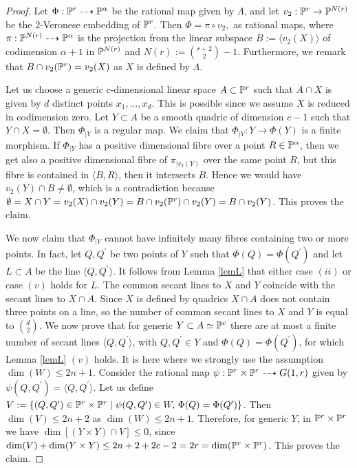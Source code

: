 \documentclass{amsart}
\theoremstyle{definition}
\begin{document}
\begin{proof}
Let $\Phi:\Bbb{P}^r\dashrightarrow\Bbb{P}^{\alpha}$ be the rational
map given by $\Lambda$, and let $v_{2}:\Bbb{P}^r\to\Bbb{P}^{N(r)}$
be the $2$-Veronese embedding of $\Bbb{P}^r$. Then $\Phi =\pi \circ
v_{2},$ as rational maps, where
$\pi:\Bbb{P}^{N(r)}\dashrightarrow\Bbb P^{\alpha}$ is the projection
from the linear subspace $B:=\langle v_2(X)\rangle $ of codimension
$\alpha+1$ in $\Bbb{P}^{N(r)}$ and $N(r):=\binom{r+2}{2}-1$.
Furthermore, we remark that $B\cap v_{2}(\Bbb{P}^{r})=v_{2}(X)$ as
$X$ is defined by $\Lambda$.

Let us choose a generic $c$-dimensional linear space $A\subset
\Bbb{P}^{r}$ such that $A\cap X$ is given by $d$ distinct points
$x_{1},\dots,x_{d}$. This is possible since we assume $X$ is reduced
in codimension zero. Let $Y\subset A$ be a smooth quadric of
dimension $c-1$ such that $Y\cap X=\emptyset$. Then $\Phi_{|Y}$ is a
regular map. We claim that $\Phi _{|Y}:Y\to\Phi(Y)$ is a finite
morphism. If $\Phi_{|Y}$ has a positive dimensional fibre over a
point $R\in \Bbb{P}^{\alpha }$, then we get also a positive
dimensional fibre of $\pi _{|v_{2}(Y)}$ over the same point $R$, but
this fibre is contained in $\langle B,R\rangle $, then it intersects
$B$. Hence we would have $v_{2}(Y)\cap B\neq \emptyset$, which is a
contradiction because $\emptyset =X\cap Y=v_{2}(X)\cap
v_{2}(Y)=B\cap v_{2}(\Bbb{P}^{r})\cap v_{2}(Y)=B\cap v_{2}(Y)$. This
proves the claim.

We now claim that $\Phi _{|Y}$ cannot have infinitely many fibres
containing two or more points. In fact, let $Q,Q^{\prime }$ be two
points of $Y$ such that $\Phi (Q)=\Phi (Q^{\prime })$ and let
$L\subset A$ be the line $\langle Q,Q^{\prime }\rangle $. It follows
from Lemma \ref{lemL} that either case $(ii)$ or case $(v)$ holds
for $L$. The common secant lines to $X$ and $Y$ coincide with the
secant lines to $X\cap A$. Since $X$ is defined by quadrics $X\cap
A$ does not contain three points on a line, so the number of common
secant lines to $X$ and $Y$ is equal to $\binom{d}{2}$. We now prove
that for generic $Y\subset A\simeq\Bbb{P}^{c}$ there are at most a
finite number of secant lines $\langle Q,Q^{\prime }\rangle $, with
$Q,Q^{\prime }\in Y$ and $\Phi (Q)=\Phi (Q^{\prime })$, for which
Lemma \ref{lemL} $(v)$ holds. It is here where we strongly use the
assumption $\dim(W)\leq 2n+1$. Consider the rational map $\psi
:\Bbb{P}^{r}\times \Bbb{P}^{r}\dasharrow G(1,r)$ given by $\psi
(Q,Q^{\prime })=\langle Q,Q^{\prime }\rangle $. Let us define
$V:=\{(Q,Q^{\prime })\in \Bbb{P}^{r}\times \Bbb{P}^{r}\mid\psi
(Q,Q^{\prime })\in W,\, \Phi (Q)=\Phi (Q^{\prime })\}$. Then
$\dim(V)\leq 2n+2$ as $\dim (W)\leq 2n+1.$ Therefore, for generic
$Y$, in $\Bbb{P}^{r}\times \Bbb{P}^{r}$ we have $\dim[(Y\times
Y)\cap V]\leq 0$, since $\dim (V)+\dim (Y\times Y)\leq
2n+2+2c-2=2r=\dim (\Bbb{P}^{r}\times \Bbb{P}^{r})$. This proves the
claim.


\end{proof}
\end{document}
